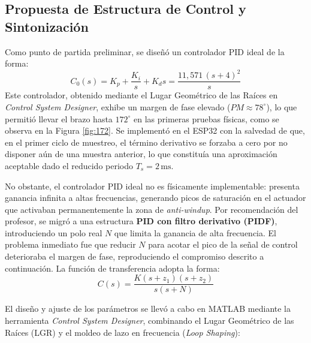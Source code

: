 \subsection{Propuesta de Estructura de Control y Sintonización}
Como punto de partida preliminar, se diseñó un controlador PID ideal de la forma:
\begin{equation}
  C_0(s) = K_p + \frac{K_i}{s} + K_d s = \frac{11{,}571\,(s+4)^2}{s}
\end{equation}
Este controlador, obtenido mediante el Lugar Geométrico de las Raíces en \textit{Control System Designer}, exhibe un margen de fase elevado ($PM \approx 78^\circ$), lo que permitió llevar el brazo hasta $172^\circ$ en las primeras pruebas físicas, como se observa en la Figura \ref{fig:172}. Se implementó en el ESP32 con la salvedad de que, en el primer ciclo de muestreo, el término derivativo se forzaba a cero por no disponer aún de una muestra anterior, lo que constituía una aproximación aceptable dado el reducido periodo $T_s = 2\,\mathrm{ms}$.

No obstante, el controlador PID ideal no es físicamente implementable: presenta ganancia infinita a altas frecuencias, generando picos de saturación en el actuador que activaban permanentemente la zona de \textit{anti-windup}. Por recomendación del profesor, se migró a una estructura \textbf{PID con filtro derivativo (PIDF)}, introduciendo un polo real $N$ que limita la ganancia de alta frecuencia. El problema inmediato fue que reducir $N$ para acotar el pico de la señal de control deterioraba el margen de fase, reproduciendo el compromiso descrito a continuación. La función de transferencia adopta la forma:
\begin{equation}
  C(s) = \frac{K(s + z_1)(s + z_2)}{s(s + N)}
  \label{eq:PIDF_zeros}
\end{equation}

El diseño y ajuste de los parámetros se llevó a cabo en MATLAB mediante la herramienta \textit{Control System Designer}, combinando el Lugar Geométrico de las Raíces (LGR) y el moldeo de lazo en frecuencia (\textit{Loop Shaping}):

